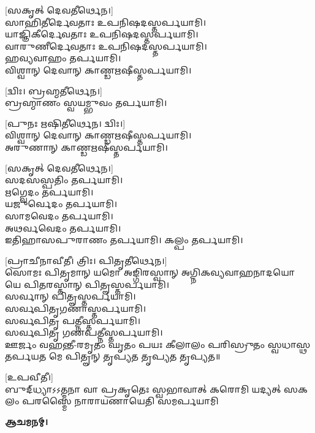 {\scriptsize [𑌸𑌕𑍃𑌤𑍍 𑌦𑍇𑌵𑌤𑍀𑌰𑍍𑌥𑍇𑌨।]}\\
𑌸𑌾𑌹𑌿𑌤𑍀𑌰𑍍𑌦𑍇𑌵𑌤𑌾𑌃 𑌉𑌪𑌨𑌿𑌷𑌦𑌸𑍍𑌤𑌰𑍍𑌪𑌯𑌾𑌮𑌿।\\
𑌯𑌾𑌜𑍍𑌞𑌿𑌕𑍀𑌰𑍍𑌦𑍇𑌵𑌤𑌾𑌃 𑌉𑌪𑌨𑌿𑌷𑌦𑌸𑍍𑌤𑌰𑍍𑌪𑌯𑌾𑌮𑌿।\\
𑌵𑌾𑌰𑍁𑌣𑍀𑌰𑍍𑌦𑍇𑌵𑌤𑌾𑌃 𑌉𑌪𑌨𑌿𑌷𑌦𑌸𑍍𑌤𑌰𑍍𑌪𑌯𑌾𑌮𑌿।\\
𑌹𑌵𑍍𑌯𑌵𑌾𑌹𑌂 𑌤𑌰𑍍𑌪𑌯𑌾𑌮𑌿।\\
𑌵𑌿𑌶𑍍𑌵𑌾𑌨𑍍 𑌦𑍇𑌵𑌾𑌨𑍍 𑌕𑌾𑌣𑍍𑌡𑌋𑌷𑍀𑌸𑍍𑌤𑌰𑍍𑌪𑌯𑌾𑌮𑌿।

{\scriptsize [𑌦𑍍𑌵𑌿𑌃। 𑌬𑍍𑌰𑌹𑍍𑌮𑌤𑍀𑌰𑍍𑌥𑍇𑌨।]}\\
𑌬𑍍𑌰𑌹𑍍𑌮𑌾𑌣𑌂 𑌸𑍍𑌵𑌯𑌮𑍍𑌭𑍁𑌵𑌂 𑌤𑌰𑍍𑌪𑌯𑌾𑌮𑌿।

{\scriptsize [𑌪𑍁𑌨𑌃 𑌋𑌷𑌿𑌤𑍀𑌰𑍍𑌥𑍇𑌨। 𑌦𑍍𑌵𑌿𑌃।]}\\
𑌵𑌿𑌶𑍍𑌵𑌾𑌨𑍍 𑌦𑍇𑌵𑌾𑌨𑍍 𑌕𑌾𑌣𑍍𑌡𑌋𑌷𑍀𑌸𑍍𑌤𑌰𑍍𑌪𑌯𑌾𑌮𑌿।\\
𑌅𑌰𑍁𑌣𑌾𑌨𑍍 𑌕𑌾𑌣𑍍𑌡𑌋𑌷𑍀𑌸𑍍𑌤𑌰𑍍𑌪𑌯𑌾𑌮𑌿।

{\scriptsize [𑌸𑌕𑍃𑌤𑍍 𑌦𑍇𑌵𑌤𑍀𑌰𑍍𑌥𑍇𑌨।]}\\
𑌸𑌦𑌸𑌸𑍍𑌪𑌤𑌿𑌂 𑌤𑌰𑍍𑌪𑌯𑌾𑌮𑌿।\\
𑌋𑌗𑍍𑌵𑍇𑌦𑌂 𑌤𑌰𑍍𑌪𑌯𑌾𑌮𑌿।\\
𑌯𑌜𑍁𑌰𑍍𑌵𑍇𑌦𑌂 𑌤𑌰𑍍𑌪𑌯𑌾𑌮𑌿।\\
𑌸𑌾𑌮𑌵𑍇𑌦𑌂 𑌤𑌰𑍍𑌪𑌯𑌾𑌮𑌿।\\
𑌅𑌥𑌰𑍍𑌵𑌵𑍇𑌦𑌂 𑌤𑌰𑍍𑌪𑌯𑌾𑌮𑌿।\\
𑌇𑌤𑌿𑌹𑌾𑌸𑌪𑍁𑌰𑌾𑌣𑌂 𑌤𑌰𑍍𑌪𑌯𑌾𑌮𑌿। 𑌕𑌲𑍍𑌪𑌂 𑌤𑌰𑍍𑌪𑌯𑌾𑌮𑌿।

{\scriptsize [𑌪𑍍𑌰𑌾𑌚𑍀𑌨𑌾𑌵𑍀𑌤𑍀। 𑌤𑍍𑌰𑌿𑌃। 𑌪𑌿𑌤𑍃𑌤𑍀𑌰𑍍𑌥𑍇𑌨।]}\\
𑌸𑍋𑌮𑌃 𑌪𑌿𑌤𑍃𑌮𑌾𑌨𑍍 𑌯𑌮𑍋 𑌅𑌙𑍍𑌗𑌿𑌰𑌸𑍍𑌵𑌾𑌨𑍍 𑌅𑌗𑍍𑌨𑌿𑌕𑌵𑍍𑌯𑌵𑌾𑌹𑌨𑌾𑌦𑌯𑍋 𑌯𑍇 𑌪𑌿𑌤𑌰𑌸𑍍𑌤𑌾𑌨𑍍 𑌪𑌿𑌤𑍄𑌸𑍍𑌤𑌰𑍍𑌪𑌯𑌾𑌮𑌿।\\
𑌸𑌰𑍍𑌵𑌾𑌨𑍍 𑌪𑌿𑌤𑍄𑌸𑍍𑌤𑌰𑍍𑌪𑌯𑌾𑌮𑌿।\\
𑌸𑌰𑍍𑌵𑌪𑌿𑌤𑍃𑌗𑌣𑌾𑌸𑍍𑌤𑌰𑍍𑌪𑌯𑌾𑌮𑌿।\\
𑌸𑌰𑍍𑌵𑌪𑌿𑌤𑍃 𑌪𑌤𑍍𑌨𑍀𑌸𑍍𑌤𑌰𑍍𑌪𑌯𑌾𑌮𑌿।\\
𑌸𑌰𑍍𑌵𑌪𑌿𑌤𑍃 𑌗𑌣𑌪𑌤𑍍𑌨𑍀𑌸𑍍𑌤𑌰𑍍𑌪𑌯𑌾𑌮𑌿।\\
𑌊𑌰𑍍𑌜𑌂 𑌵𑌹𑌨𑍍𑌤𑍀-𑌰𑌮𑍃𑌤𑌂 𑌘𑍃𑌤𑌂 𑌪𑌯𑌃 𑌕𑍀𑌲𑌾𑌲𑌂 𑌪𑌰𑌿𑌸𑍍𑌰𑍁𑌤𑌂 𑌸𑍍𑌵𑌧𑌾𑌸𑍍𑌥 𑌤𑌰𑍍𑌪𑌯𑌤 𑌮𑍇 𑌪𑌿𑌤𑍄𑌨𑍍 𑌤𑍃𑌪𑍍𑌯𑌤 𑌤𑍃𑌪𑍍𑌯𑌤 𑌤𑍃𑌪𑍍𑌯𑌤॥

{\scriptsize [𑌉𑌪𑌵𑍀𑌤𑍀।]}\\
\vspace{-3ex}
{𑌬𑍁𑌦𑍍‌𑌧𑍍𑌯𑌾𑌽𑌽𑌤𑍍𑌮𑌨𑌾 𑌵𑌾 𑌪𑍍𑌰𑌕𑍃𑌤𑍇𑌃 𑌸𑍍𑌵𑌭𑌾𑌵𑌾𑌤𑍍}
{𑌕𑌰𑍋𑌮𑌿 𑌯𑌦𑍍𑌯𑌤𑍍 𑌸𑌕𑌲𑌂 𑌪𑌰𑌸𑍍𑌮𑍈}
{𑌨𑌾𑌰𑌾𑌯𑌣𑌾𑌯𑍇𑌤𑌿 𑌸𑌮𑌰𑍍𑌪𑌯𑌾𑌮𑌿}

\textbf{𑌆𑌚𑌮𑌨𑌮𑍍।}

